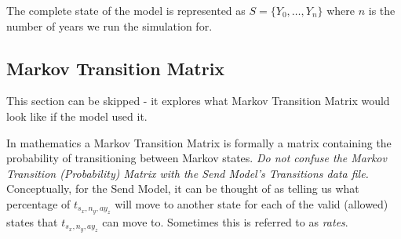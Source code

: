 \documentclass[margin=5mm]{article}
\begin{document}
The complete state of the model is represented as $S = \{Y_0, \dots,
Y_n\}$ where $n$ is the number of years we run the simulation for.

\subsection{Markov Transition Matrix}

This section can be skipped - it explores what Markov Transition
Matrix would look like if the model used it.

In mathematics a Markov Transition Matrix is formally a matrix
containing the probability of transitioning between Markov
states. \textit{Do not confuse the Markov Transition (Probability)
  Matrix with the Send Model's Transitions data file.}  Conceptually,
for the Send Model, it can be thought of as telling us what percentage
of $t_{s_x,n_y,ay_z}$ will move to another state \- for each of the
valid (allowed) states that $t_{s_x,n_y,ay_z}$ can move to.  Sometimes
this is referred to as \textit{rates}.
\end{document}
